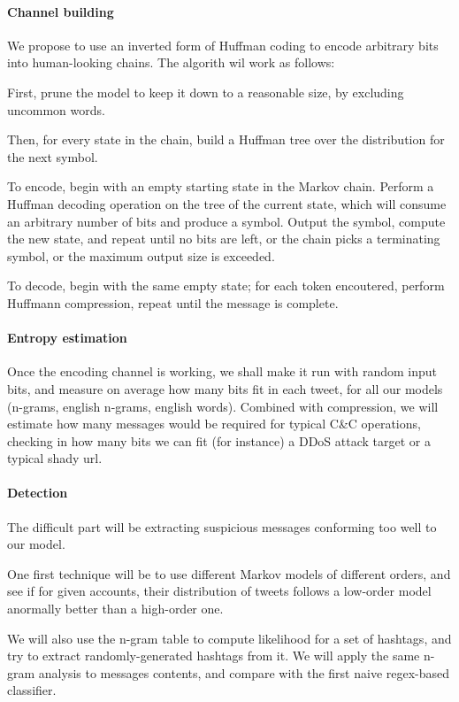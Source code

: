 \documentclass[a4paper,11pt]{article}
\begin{document}
\paragraph{Channel building}

We propose to use an inverted form of Huffman coding to encode arbitrary bits into human-looking chains. The algorith wil work as follows:

First, prune the model to keep it down to a reasonable size, by excluding uncommon words.

Then, for every state in the chain, build a Huffman tree over the distribution for the next symbol.

To encode, begin with an empty starting state in the Markov chain. Perform a Huffman decoding operation on the tree of the current state, which will consume an arbitrary number of bits and produce a symbol. Output the symbol, compute the new state, and repeat until no bits are left, or the chain picks a terminating symbol, or the maximum output size is exceeded.

To decode, begin with the same empty state; for each token encoutered, perform Huffmann compression, repeat until the message is complete.

\paragraph{Entropy estimation}

Once the encoding channel is working, we shall make it run with random input bits, and measure on average how many bits fit in each tweet, for all our models (n-grams, english n-grams, english words). Combined with compression, we will estimate how many messages would be required for typical C\&C operations, checking in how many bits we can fit (for instance) a DDoS attack target or a typical shady url.

\paragraph{Detection}

The difficult part will be extracting suspicious messages conforming too well to our model. 

One first technique will be to use different Markov models of different orders, and see if for given accounts, their distribution of tweets follows a low-order model anormally better than a high-order one.

We will also use the n-gram table to compute likelihood for a set of hashtags, and try to extract randomly-generated hashtags from it. We will apply the same n-gram analysis to messages contents, and compare with the first naive regex-based classifier.
\end{document}
